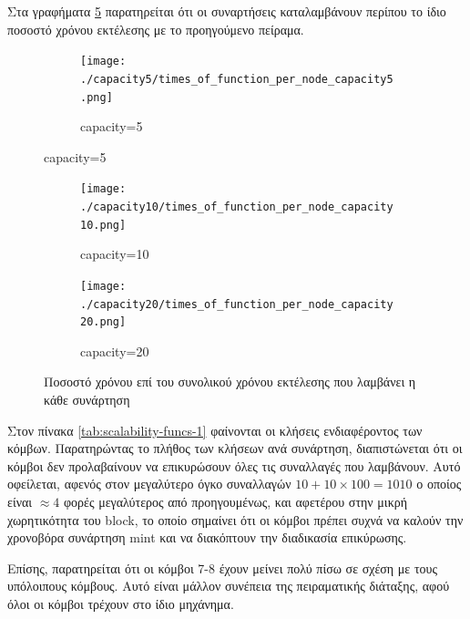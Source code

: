 \documentclass{article}
\newcommand{\eng}[1]{\foreignlanguage{english}{#1}} %
\begin{document}
Στα γραφήματα \ref{fig:scalability-funcs} παρατηρείται ότι οι συναρτήσεις
καταλαμβάνουν περίπου το ίδιο ποσοστό χρόνου εκτέλεσης με το προηγούμενο
πείραμα.

\begin{figure}[ht]
    \centering
    \begin{subfigure}{\textwidth}
        \texttt{[image: ./capacity5/times\_of\_function\_per\_node\_capacity5.png]}
        \caption{\eng{capacity=5}}
        \label{fig:scalability-funcs-5}
    \end{subfigure}
\end{figure}
\begin{figure}[ht]
    \ContinuedFloat
    \begin{subfigure}{\textwidth}
        \texttt{[image: ./capacity10/times\_of\_function\_per\_node\_capacity10.png]}
        \caption{\eng{capacity=10}}
        \label{fig:scalability-funcs-10}
    \end{subfigure}
    \centering
    \begin{subfigure}{\textwidth}
        \texttt{[image: ./capacity20/times\_of\_function\_per\_node\_capacity20.png]}
        \caption{\eng{capacity=20}}
        \label{fig:scalability-funcs-20}
    \end{subfigure}
    \caption{Ποσοστό χρόνου επί του συνολικού χρόνου εκτέλεσης που λαμβάνει η κάθε συνάρτηση}
    \label{fig:scalability-funcs}
\end{figure}
\FloatBarrier


Στον πίνακα \ref{tab:scalability-funcs-1} φαίνονται οι κλήσεις ενδιαφέροντος
των κόμβων. Παρατηρώντας το πλήθος των κλήσεων ανά συνάρτηση, διαπιστώνεται ότι
οι κόμβοι δεν προλαβαίνουν να επικυρώσουν όλες τις συναλλαγές που λαμβάνουν.
Αυτό οφείλεται, αφενός στον μεγαλύτερο όγκο συναλλαγών $10 + 10 \times 100 =
1010$ ο οποίος είναι $\approx 4$ φορές μεγαλύτερος από προηγουμένως, και
αφετέρου στην μικρή χωρητικότητα του \eng{block}, το οποίο σημαίνει ότι οι
κόμβοι πρέπει συχνά να καλούν την χρονοβόρα συνάρτηση \eng{mint} και να
διακόπτουν την διαδικασία επικύρωσης.

Επίσης, παρατηρείται ότι οι κόμβοι 7-8 έχουν μείνει πολύ πίσω σε σχέση
με τους υπόλοιπους κόμβους. Αυτό είναι μάλλον συνέπεια της πειραματικής
διάταξης, αφού όλοι οι κόμβοι τρέχουν στο ίδιο μηχάνημα.
\end{document}

